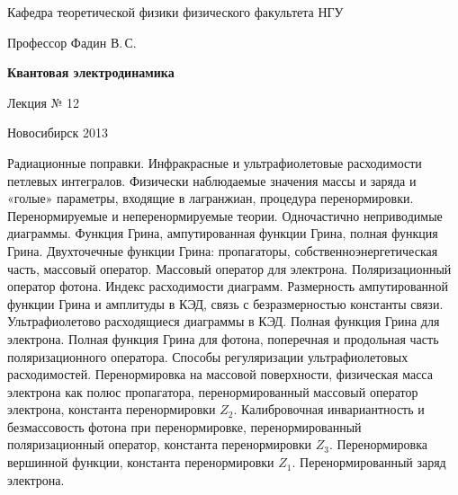 \documentclass[12pt,pagesize,paper=192mm:108mm]{scrbook}
\begin{document}
\begin{titlepage}
\begin{center}
    Кафедра теоретической физики физического факультета НГУ
    \medskip

    \Large
    Профессор Фадин В.\,С.
    \bigskip

    \huge
    \textbf{Квантовая электродинамика}
    \bigskip

    \Large
    Лекция № 12
    \vfill

    \normalsize
    \vfill

    \normalsize \ccbysa\hspace{0.5em}  Новосибирск 2013
  \end{center}
\end{titlepage}
\vspace*{-1em}
\begin{center}
\vfill
  \begin{minipage}{0.85\linewidth}
    Радиационные поправки. Инфракрасные и ультрафиолетовые
    расходимости петлевых интегралов. Физически наблюдаемые значения
    массы и заряда и «голые» параметры, входящие в лагранжиан,
    процедура перенормировки. Перенормируемые и неперенормируемые
    теории. Одночастично неприводимые диаграммы. Функция Грина,
    ампутированная функции Грина, полная функция Грина. Двухточечные
    функции Грина: пропагаторы, собственноэнергетическая часть,
    массовый оператор. Массовый оператор для электрона.
    Поляризационный оператор фотона. Индекс расходимости
    диаграмм. Размерность ампутированной функции Грина и амплитуды в
    КЭД, связь с безразмерностью константы связи. Ультрафиолетово
    расходящиеся диаграммы в КЭД. Полная функция Грина для
    электрона. Полная функция Грина для фотона, поперечная и
    продольная часть поляризационного оператора. Способы регуляризации
    ультрафиолетовых расходимостей.  Перенормировка на массовой
    поверхности, физическая масса электрона как полюс пропагатора,
    перенормированный массовый оператор электрона, константа
    перенормировки $Z_2$. Калибровочная инвариантность и безмассовость
    фотона при перенормировке, перенормированный поляризационный
    оператор, константа перенормировки $Z_3$.  Перенормировка
    вершинной функции, константа перенормировки
    $Z_1$. Перенормированный заряд электрона.
  \end{minipage}
  \vfill

\end{center}
\end{document}
